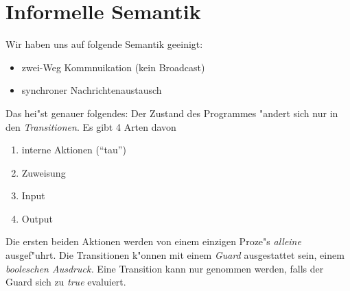 \section{Informelle Semantik}
\label{sec:semantik}





Wir haben uns auf folgende Semantik geeinigt:
\begin{itemize}
\item zwei-Weg Kommnuikation (kein Broadcast)
\item synchroner Nachrichtenaustausch
\end{itemize}
Das hei"st genauer folgendes: Der Zustand des Programmes "andert sich nur
in den \emph{Transitionen}. Es gibt 4 Arten davon
\begin{enumerate}
\item interne Aktionen (``tau'')
\item Zuweisung
\item Input
\item Output
\end{enumerate}
Die ersten beiden Aktionen werden von einem einzigen Proze"s \emph{alleine}
ausgef"uhrt. Die Transitionen k"onnen mit einem \textit{Guard} ausgestattet
sein, einem \emph{booleschen Ausdruck.} Eine Transition kann nur genommen
werden, falls der Guard sich zu \emph{true} evaluiert.




